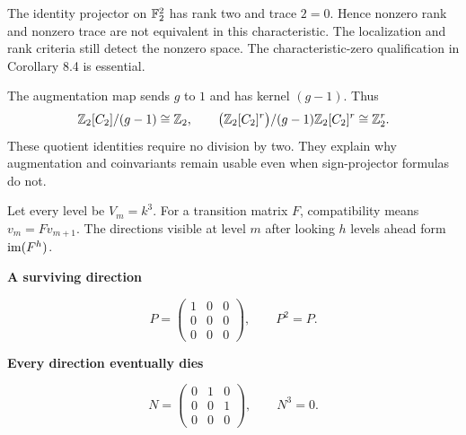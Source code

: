 The identity projector on $\mathbb F_2^2$ has rank two and trace $2=0$. Hence nonzero rank and nonzero trace are not equivalent in this characteristic. The localization and rank criteria still detect the nonzero space. The characteristic-zero qualification in Corollary 8.4 is essential.

The augmentation map sends $g$ to $1$ and has kernel $(g-1)$. Thus
\[
\mathbb Z_2[C_2]/(g-1)\cong\mathbb Z_2,
\qquad
\bigl(\mathbb Z_2[C_2]^r\bigr)/(g-1)\mathbb Z_2[C_2]^r\cong\mathbb Z_2^r.
\]
These quotient identities require no division by two. They explain why augmentation and coinvariants remain usable even when sign-projector formulas do not.


Let every level be $V_m=k^3$. For a transition matrix $F$, compatibility means $v_m=Fv_{m+1}$. The directions visible at level $m$ after looking $h$ levels ahead form $\operatorname{im}(F^h)$.

\begin{minipage}[t]{.48\linewidth}\centering
{\sffamily\bfseries A surviving direction}\par
\[
P=\begin{pmatrix}1&0&0\\0&0&0\\0&0&0\end{pmatrix},\qquad P^2=P.
\]
\end{minipage}\hfill
\begin{minipage}[t]{.48\linewidth}\centering
{\sffamily\bfseries Every direction eventually dies}\par
\[
N=\begin{pmatrix}0&1&0\\0&0&1\\0&0&0\end{pmatrix},\qquad N^3=0.
\]
\end{minipage}

